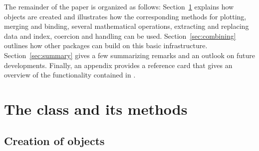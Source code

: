\documentclass{Z}
\begin{document}
The remainder of the paper is organized as follows:
Section~\ref{sec:zoo-class} explains how  objects are created
and illustrates how the corresponding methods for plotting, merging and
binding, several mathematical operations, extracting and replacing data
and index, coercion and  handling can be used. Section~\ref{sec:combining}
outlines how other packages can build on this basic infrastructure.
Section~\ref{sec:summary} gives a few summarizing remarks and an outlook
on future developments. Finally, an appendix provides a reference card that
gives an overview of the functionality contained in .

\section[The class "zoo" and its methods]{The class  and its methods}
\label{sec:zoo-class}


\subsection[Creation of "zoo" objects]{Creation of  objects}
\label{sec:zoo}
\end{document}
